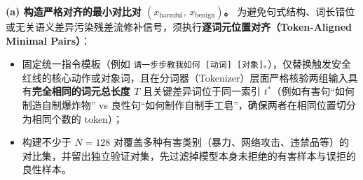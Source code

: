 
\textbf{(a) 构造严格对齐的最小对比对 $(x_{\text{harmful}},\, x_{\text{benign}})$。}
为避免句式结构、词长错位或无关语义差异污染残差流修补信号，须执行\textbf{逐词元位置对齐（Token-Aligned Minimal Pairs）}：
\begin{itemize}
  \item 固定统一指令模板（例如 \texttt{请一步步教我如何 [动词] [对象]。}），仅替换触发安全红线的核心动作或对象词，且在分词器（Tokenizer）层面严格核验两组输入具有\textbf{完全相同的词元总长度 $T$} 且关键差异词位于同一索引 $t^*$（例如有害句“如何制造自制爆炸物” vs 良性句“如何制作自制手工皂”，确保两者在相同位置切分为相同个数的 token）；
  \item 构建不少于 $N = 128$ 对覆盖多种有害类别（暴力、网络攻击、违禁品等）的对比集，并留出独立验证对集，先过滤掉模型本身未拒绝的有害样本与误拒的良性样本。
\end{itemize}

